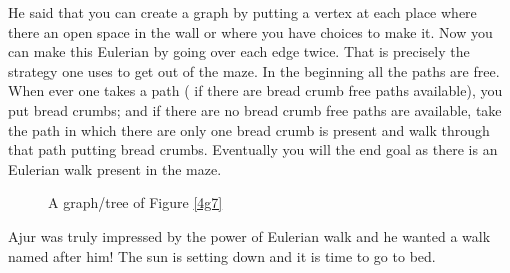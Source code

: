 He said that you can create a graph by putting a vertex at each place where there an open space in the wall or where you have choices to make it. Now you can make this Eulerian by going over each edge twice.
That is precisely the strategy one uses to get out of the maze.  In the beginning all the paths are free. When ever one takes a path ( if there are bread crumb free paths available), you put bread crumbs; and if there are no bread crumb free paths are available, take the path in which there are only one bread crumb is present and walk through that path putting bread crumbs. Eventually you will the end goal as there is an Eulerian walk present in the maze.

\begin{figure}
\begin{center}
\caption{ A graph/tree of Figure \ref{4g7}}\label{4g8}
\end{center}
\end{figure}

Ajur was truly impressed by the power of Eulerian walk and he wanted a walk named after him! The sun is setting down and it is time to go to bed.